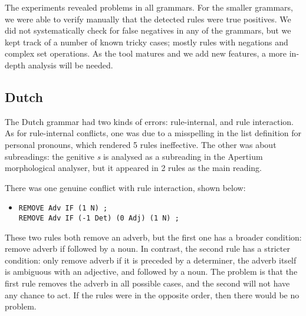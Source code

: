 The experiments revealed problems in all grammars. For the smaller
grammars, we were able to verify manually that the detected rules were
true positives.
We did not systematically check for false negatives in any of the
grammars, but we kept track of a number of known tricky cases; mostly
rules with negations and complex set operations.
As the tool matures and we add new features, a more in-depth analysis
will be needed.

\subsection{Dutch} The Dutch grammar had two kinds of errors: rule-internal, and rule interaction. As for rule-internal conflicts, one was due to a misspelling in the list definition for personal pronouns, which rendered 5 rules ineffective. The other was about subreadings: the genitive \emph{s} is analysed as a subreading in the Apertium morphological analyser, but it appeared in 2 rules as the main reading. 

There was one genuine conflict with rule interaction, shown below:

\begin{itemize}
\item[] 
\begin{verbatim}REMOVE Adv IF (1 N) ;
REMOVE Adv IF (-1 Det) (0 Adj) (1 N) ;
\end{verbatim}
\end{itemize}

These two rules both remove an adverb, but the first one has a broader condition:
remove adverb if followed by a noun. In contrast, the second rule has a stricter condition: only remove adverb if it is preceded by a determiner, the adverb itself is ambiguous with an adjective, and followed by a noun. The problem is that the first rule removes the adverb in all possible cases, and the second will not have any chance to act. If the rules were in the opposite order, then there would be no problem.




